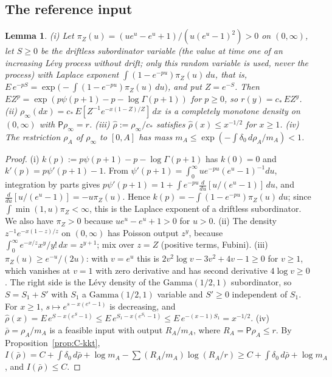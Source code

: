 \documentclass[10pt,letterpaper]{article}
\newtheorem{lemma}[theorem]{Lemma}
\begin{document}
\subsection{The reference input}\label{app:C-ref-sec}

\begin{lemma}\label{lem:C-ref}
(i) Let $\pi_Z(u)=(ue^u-e^u+1)/(u(e^u-1)^2)>0$ on $(0,\infty)$, let $S\ge0$ be the driftless subordinator variable (the value at time one of an increasing L\'evy process without drift; only this random variable is used, never the process) with Laplace
exponent $\int(1-e^{-pu})\pi_Z(u)\,du$, that is, $E\,e^{-pS}=\exp\bigl(-\int(1-e^{-pu})\pi_Z(u)\,du\bigr)$, and put $Z=e^{-S}$. Then $EZ^p=\exp(p\psi(p+1)-p-\log\Gamma(p+1))$ for $p\ge0$, so
$r(y)=c_*\,EZ^y$.
(ii) $\rho_\infty(dx)=c_*\,E[Z^{-1}e^{-x(1-Z)/Z}]\,dx$ is a completely monotone density on $(0,\infty)$ with $\mathsf P\rho_\infty=r$.
(iii) $\hat\rho:=\rho_\infty/c_*$ satisfies $\hat\rho(x)\le x^{-1/2}$ for $x\ge1$.
(iv) The restriction $\rho_A$ of $\rho_\infty$ to $[0,A]$ has mass $m_A\le\exp(-\int\delta_0\,d\rho_A/m_A)<1$.
\end{lemma}
\begin{proof}
(i) $k(p):=p\psi(p+1)-p-\log\Gamma(p+1)$ has $k(0)=0$ and $k'(p)=p\psi'(p+1)-1$. From
$\psi'(p+1)=\int_0^\infty ue^{-pu}(e^u-1)^{-1}du$, integration by parts gives $p\psi'(p+1)=1+\int e^{-pu}\frac{d}{du}[u/(e^u-1)]\,du$, and
$\frac{d}{du}[u/(e^u-1)]=-u\pi_Z(u)$. Hence $k(p)=-\int(1-e^{-pu})\pi_Z(u)\,du$; since $\int\min(1,u)\pi_Z<\infty$, this is the Laplace
exponent of a driftless subordinator. We also have $\pi_Z>0$ because $ue^u-e^u+1>0$ for $u>0$.
(ii) The density $z^{-1}e^{-x(1-z)/z}$ on $(0,\infty)$ has Poisson output $z^y$, because $\int_0^\infty e^{-x/z}x^y/y!\,dx=z^{y+1}$;
mix over $z=Z$ (positive terms, Fubini).
(iii) $\pi_Z(u)\ge e^{-u}/(2u)$: with $v=e^u$ this is $2v^2\log v-3v^2+4v-1\ge0$ for $v\ge1$, which vanishes at $v=1$ with zero
derivative and has second derivative $4\log v\ge0$. The right side is the L\'evy density of the $\mathrm{Gamma}(1/2,1)$ subordinator,
so $S=S_1+S'$ with $S_1$ a $\mathrm{Gamma}(1/2,1)$ variable and $S'\ge0$ independent of $S_1$. For $x\ge1$, $s\mapsto e^{s-x(e^s-1)}$ is decreasing, and
$\hat\rho(x)=E\,e^{S-x(e^S-1)}\le E\,e^{S_1-x(e^{S_1}-1)}\le E\,e^{-(x-1)S_1}=x^{-1/2}$.
(iv) $\bar\rho=\rho_A/m_A$ is a feasible input with output $R_A/m_A$, where $R_A=\mathsf P\rho_A\le r$. By Proposition~\ref{prop:C-kkt},
$I(\bar\rho)=C+\int\delta_0\,d\bar\rho+\log m_A-\sum(R_A/m_A)\log(R_A/r)\ge C+\int\delta_0\,d\bar\rho+\log m_A$, and $I(\bar\rho)\le C$.
\end{proof}
\end{document}
